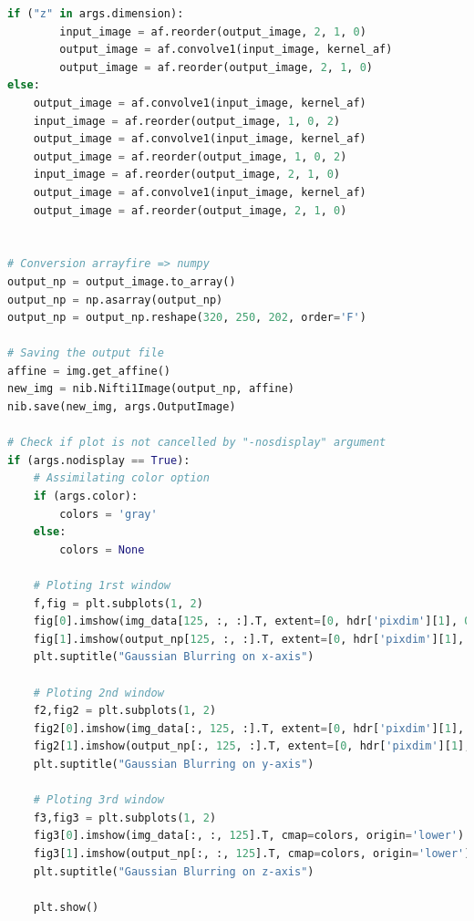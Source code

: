 \documentclass[10pt]{report}
\begin{document}
\begin{appendix}
\begin{lstlisting}[language=python]
	if ("z" in args.dimension):
		input_image = af.reorder(output_image, 2, 1, 0)
		output_image = af.convolve1(input_image, kernel_af)
		output_image = af.reorder(output_image, 2, 1, 0)
else:
	output_image = af.convolve1(input_image, kernel_af)
	input_image = af.reorder(output_image, 1, 0, 2)
	output_image = af.convolve1(input_image, kernel_af)
	output_image = af.reorder(output_image, 1, 0, 2)
	input_image = af.reorder(output_image, 2, 1, 0)
	output_image = af.convolve1(input_image, kernel_af)
	output_image = af.reorder(output_image, 2, 1, 0)


# Conversion arrayfire => numpy
output_np = output_image.to_array()
output_np = np.asarray(output_np)
output_np = output_np.reshape(320, 250, 202, order='F')

# Saving the output file
affine = img.get_affine()
new_img = nib.Nifti1Image(output_np, affine)
nib.save(new_img, args.OutputImage)

# Check if plot is not cancelled by "-nosdisplay" argument
if (args.nodisplay == True):
	# Assimilating color option
	if (args.color):
		colors = 'gray'
	else:
		colors = None
	
	# Ploting 1rst window
	f,fig = plt.subplots(1, 2)
	fig[0].imshow(img_data[125, :, :].T, extent=[0, hdr['pixdim'][1], 0, hdr['pixdim'][3]], cmap=colors, origin='lower')
	fig[1].imshow(output_np[125, :, :].T, extent=[0, hdr['pixdim'][1], 0, hdr['pixdim'][3]], cmap=colors, origin='lower')
	plt.suptitle("Gaussian Blurring on x-axis")
	
	# Ploting 2nd window
	f2,fig2 = plt.subplots(1, 2)
	fig2[0].imshow(img_data[:, 125, :].T, extent=[0, hdr['pixdim'][1], 0, hdr['pixdim'][3]], cmap=colors, origin='lower')
	fig2[1].imshow(output_np[:, 125, :].T, extent=[0, hdr['pixdim'][1], 0, hdr['pixdim'][3]], cmap=colors, origin='lower')
	plt.suptitle("Gaussian Blurring on y-axis")
	
	# Ploting 3rd window
	f3,fig3 = plt.subplots(1, 2)
	fig3[0].imshow(img_data[:, :, 125].T, cmap=colors, origin='lower')
	fig3[1].imshow(output_np[:, :, 125].T, cmap=colors, origin='lower')
	plt.suptitle("Gaussian Blurring on z-axis")
	
	plt.show()
	\end{lstlisting}

\end{appendix}
\end{document}
